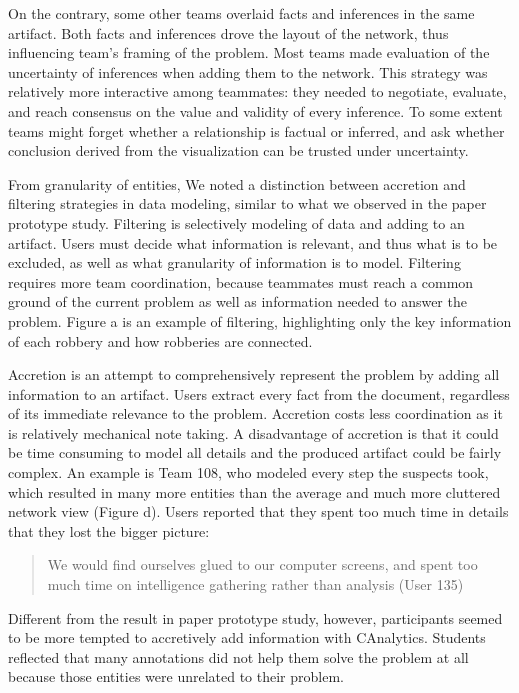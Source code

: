 \documentclass[]{article}
\begin{document}
On the contrary, some other teams overlaid facts and inferences in the
same artifact. Both facts and inferences drove the layout of the
network, thus influencing team's framing of the problem. Most teams made
evaluation of the uncertainty of inferences when adding them to the
network. This strategy was relatively more interactive among teammates:
they needed to negotiate, evaluate, and reach consensus on the value and
validity of every inference. To some extent teams might forget whether a
relationship is factual or inferred, and ask whether conclusion derived
from the visualization can be trusted under uncertainty.

From granularity of entities, We noted a distinction between accretion
and filtering strategies in data modeling, similar to what we observed
in the paper prototype study. Filtering is selectively modeling of data
and adding to an artifact. Users must decide what information is
relevant, and thus what is to be excluded, as well as what granularity
of information is to model. Filtering requires more team coordination,
because teammates must reach a common ground of the current problem as
well as information needed to answer the problem. Figure
\autocite{fig:network}a is an example of filtering, highlighting only
the key information of each robbery and how robberies are connected.

Accretion is an attempt to comprehensively represent the problem by
adding all information to an artifact. Users extract every fact from the
document, regardless of its immediate relevance to the problem.
Accretion costs less coordination as it is relatively mechanical note
taking. A disadvantage of accretion is that it could be time consuming
to model all details and the produced artifact could be fairly complex.
An example is Team 108, who modeled every step the suspects took, which
resulted in many more entities than the average and much more cluttered
network view (Figure \autocite{fig:network}d). Users reported that they
spent too much time in details that they lost the bigger picture:

\begin{quote}
We would find ourselves glued to our computer screens, and spent too
much time on intelligence gathering rather than analysis (User 135)
\end{quote}

Different from the result in paper prototype study, however,
participants seemed to be more tempted to accretively add information
with CAnalytics. Students reflected that many annotations did not help
them solve the problem at all because those entities were unrelated to
their problem.
\end{document}
